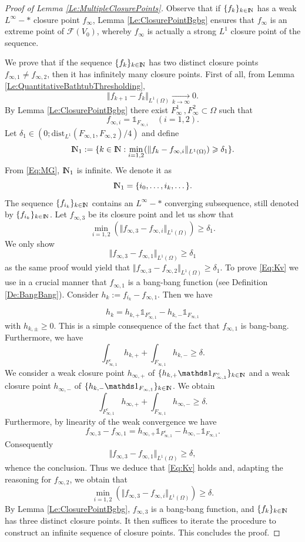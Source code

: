 \documentclass{article}
\newcommand{\N}{\textnormal{I\kern-0.21emN}}
\renewcommand{\geq}{\geqslant}
\def\O{{\Omega}}
\numberwithin{equation}{section}
\begin{document}
\begin{proof}[Proof of Lemma \ref{Le:MultipleClosurePoints}]Observe that if $\{f_k\}_{k\in \N}$ has a weak $L^\infty-*$ closure point $f_\infty$, Lemma \ref{Le:ClosurePointBgbg} ensures that $f_\infty$ is an extreme point of $\mathcal F(V_0)$, whereby  $f_\infty$ is actually a strong $L^1$ closure point of the sequence.

We prove that if the sequence $\{f_k\}_{k\in\N}$ has two distinct closure points $f_{\infty,1}\neq f_{\infty,2}$,  then it has infinitely many closure points. First of all, from Lemma \ref{Le:QuantitativeBathtubThresholding}, 
\begin{equation}\label{Eq:MG}
\Vert f_{k+1}-f_k\Vert_{L^1(\O)}\underset{k\to\infty}\rightarrow 0.
\end{equation}
By Lemma \ref{Le:ClosurePointBgbg} there exist $F_\infty^1\,, F_\infty^2\subset \O$ such that 
\[ f_{\infty,i}=\mathds 1_{F_{\infty,i}}\quad (i=1,2).\]
Let $\delta_1\in (0;\mathrm{dist}_{L^1}(F_{\infty,1},F_{\infty,2})/4)$ and define
\[ \N_1:=\{k\in \N: \min_{i=1,2}(\Vert f_k-f_{\infty,i}\Vert_{L^1(\O)})\geq \delta_1\}.\] From \eqref{Eq:MG}, $\N_1$ is infinite. We denote it as 
\[\N_1=\{i_0,\dots,i_k,\dots\}.\] The sequence $\{f_{i_k}\}_{k\in \N}$ contains an $L^\infty-*$ converging subsequence, still denoted by $\{f_{i_k}\}_{k\in \N}$. Let $f_{\infty,3}$ be its closure point and let us show that 
\[ \min_{i=1,2}(\Vert f_{\infty,3}-f_{\infty,i}\Vert_{L^1(\O)})\geq \delta_1.\]We only show 
\begin{equation}\label{Eq:Kv}
\Vert f_{\infty,3}-f_{\infty,1}\Vert_{L^1(\O)}\geq \delta_1
\end{equation} as the same proof would yield that $\Vert f_{\infty,3}-f_{\infty,2}\Vert_{L^1(\O)}\geq \delta_1$. To prove \eqref{Eq:Kv} we use in a crucial manner that $f_{\infty,1}$ is a bang-bang function (see Definition \ref{De:BangBang}). Consider $h_k:=f_{i_k}-f_{\infty,1}$. Then we have 

\[h_k=h_{k,+}\mathds 1_{F_{\infty,1}^c}-h_{k,-}\mathds 1_{F_{\infty,1}}
\] with $h_{k,\pm}\geq 0$. This is a simple consequence of the fact that $f_{\infty,1}$ is bang-bang. Furthermore, we have 
\[\int_{F_{\infty,1}^c} h_{k,+}+\int_{F_{\infty,1}}h_{k,-}\geq \delta.
\] 
We consider a weak closure point $h_{\infty,+}$ of $\{h_{k,+}\mathds 1_{F_{\infty,1}^c}\}_{k\in \N}$ and a weak closure point $h_{\infty,-}$ of $\{h_{k,-}\mathds 1_{F_{\infty,1}}\}_{k\in \N}$. We obtain
\[ \int_{F_{\infty,1}^c} h_{\infty,+}+\int_{F_{\infty,1}}h_{\infty,-}\geq \delta.\]
 Furthermore, by linearity of the weak convergence we have
\[ f_{\infty,3}-f_{\infty,1}=h_{\infty,+}\mathds 1_{F_{\infty,1}^c}-h_{\infty,-}\mathds 1_{F_{\infty,1}}.\] Consequently
\[ \Vert f_{\infty,3}-f_{\infty,1}\Vert_{L^1(\O)}\geq \delta,\] whence the conclusion. Thus we deduce that \eqref{Eq:Kv} holds and, adapting the reasoning for $f_{\infty,2}$, we obtain that 
\[ \min_{i=1,2}\left(\Vert f_{\infty,3}-f_{\infty,i}\Vert_{L^1(\O)}\right)\geq \delta.\] By Lemma \ref{Le:ClosurePointBgbg}, $f_{\infty,3}$ is a bang-bang function, and $\{f_k\}_{k\in \N}$ has three distinct closure points. It then suffices to iterate the procedure to construct  an infinite sequence of closure points. This concludes the proof.\end{proof}
\end{document}
